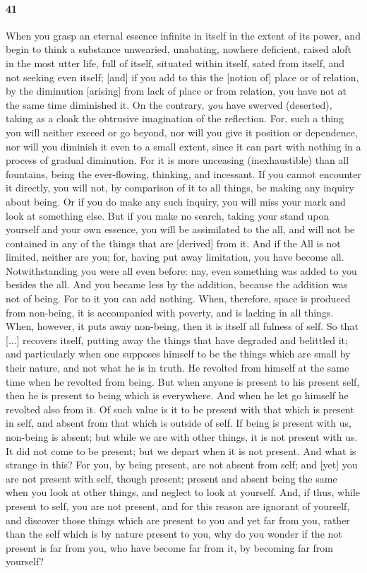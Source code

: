 \documentclass[12pt]{article}
\begin{document}
\paragraph{41} When you grasp an eternal essence infinite in itself in the extent of its power, and begin to think a substance unwearied, unabating, nowhere deficient, raised aloft in the most utter life, full of itself, situated within itself, sated from itself, and not seeking even itself; [and] if you add to this the [notion of] place or of relation, by the diminution [arising] from lack of place or from relation, you have not at the same time diminished it. On the contrary, \textit{you} have swerved (deserted), taking as a cloak the obtrusive imagination of the reflection. For, such a thing you will neither exceed or go beyond, nor will you give it position or dependence, nor will you diminish it even to a small extent, since it can part with nothing in a process of gradual diminution. For it is more unceasing (inexhaustible) than all fountains, being the ever-flowing, thinking, and incessant. If you cannot encounter it directly, you will not, by comparison of it to all things, be making any inquiry about being. Or if you do make any such inquiry, you will miss your mark and look at something else. But if you make no search, taking your stand upon yourself and your own essence, you will be assimilated to the all, and will not be contained in any of the things that are [derived] from it. And if the All is not limited, neither are you; for, having put away limitation, you have become all. Notwithstanding you were all even before: nay, even something was added to you besides the all. And you became less by the addition, because the addition was not of being. For to it you can add nothing. When, therefore, space is produced from non-being, it is accompanied with poverty, and is lacking in all things. When, however, it puts away non-being, then it is itself all fulness of self. So that [...] recovers itself, putting away the things that have degraded and belittled it; and particularly when one supposes himself to be the things which are small by their nature, and not what he is in truth. He revolted from himself at the same time when he revolted from being. But when anyone is present to his present self, then he is present to being which is everywhere. And when he let go himself he revolted also from it. Of such value is it to be present with that which is present in self, and absent from that which is outside of self. If being is present with us, non-being is absent; but while we are with other things, it is not present with us. It did not come to be present; but we depart when it is not present. And what is strange in this? For you, by being present, are not absent from self; and [yet] you are not present with self, though present; present and absent being the same when you look at other things, and neglect to look at yourself. And, if thus, while present to self, you are not present, and for this reason are ignorant of yourself, and discover those things which are present to you and yet far from you, rather than the self which is by nature present to you, why do you wonder if the not present is far from you, who have become far from it, by becoming far from yourself? 
\end{document}
